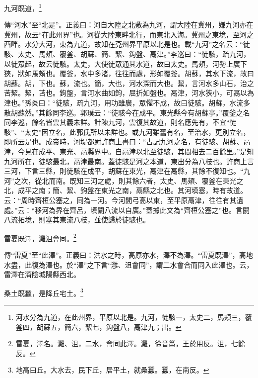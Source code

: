 九河既道，\footnote{河水分為九道，在此州界，平原以北是。九河，徒駭一，太史二，馬頰三，覆釜四，胡蘇五，簡六，絜七，鉤盤八，鬲津九；出。}

{\noindent\zhuan{}\fzbyks 傳“河水”至“北是”。正義曰：河自大陸之北敷為九河，謂大陸在冀州，嫌九河亦在冀州，故云“在此州界”也。河從大陸東畔北行，而東北入海。冀州之東境，至河之西畔。水分大河，東為九道，故知在兗州界平原以北是也。載“九河”之名云：“徒駭、太史、馬頰、覆釜、胡蘇、簡、絜、鉤盤、鬲津。”李巡曰：“徒駭，疏九河，以徒眾起，故云徒駭。太史，大使徒眾通其水道，故曰太史。馬頰，河勢上廣下狹，狀如馬頰也。覆釜，水中多渚，往往而處，形如覆釜。胡蘇，其水下流，故曰胡蘇。胡，下也。蘇，流也。簡，大也，河水深而大也。絜，言河水多山石，治之苦絜。絜，苫也。鉤盤，言河水曲如鉤，屈折如盤也。鬲津，河水狹小，可鬲以為津也。”孫炎曰：“徒駭，疏九河，用功雖廣，眾懼不成，故曰徒駭。胡蘇，水流多散胡蘇然。”其餘同李巡。郭璞云：“徒駭今在成平。東光縣今有胡蘇亭。”覆釜之名同李巡，餘名皆雲其義未詳。計陳九河，雲復其故道，則名應先有，不宜“徒駭”、“太史”因立名，此郭氏所以未詳也。或九河雖舊有名，至治水，更別立名，即所云是也。成帝時，河堤都尉許商上書曰：“古記九河之名，有徒駭、胡蘇、鬲津，今見在成平、東光、鬲縣界中。自鬲津以北至徒駭，其間相去二百餘里。”是知九河所在，徒駭最北，鬲津最南。蓋徒駭是河之本道，東出分為八枝也。許商上言三河，下言三縣，則徒駭在成平，胡蘇在東光，鬲津在鬲縣，其餘不復知也。“九河”之次，從北而南。既知三河之處，則其餘六者，太史、馬頰、覆釜在東光之北，成平之南；簡、絜、鉤盤在東光之南，鬲縣之北也。其河填塞，時有故道。云：“周時齊桓公塞之，同為一河。今河間弓高以東，至平原鬲津，往往有其遺處。”云：“移河為界在齊呂，填閼八流以自廣。”蓋據此文為“齊桓公塞之”也。言閼八流拓境，則塞其東流八枝，並使歸於徒駭也。 \par}

雷夏既澤，灉沮會同。\footnote{雷夏，澤名。灉、沮，二水，會同此澤。灉，徐音邕，王於用反。沮，七餘反。}

{\noindent\zhuan{}\fzbyks 傳“雷夏”至“此澤”。正義曰：洪水之時，高原亦水，澤不為澤。“雷夏既澤”，高地水盡，此復為澤也。於“澤”之下言“灉、沮會同”，謂二水會合而同入此澤也。云，雷澤在濟陰城陽縣西北。 \par}

桑土既蠶，是降丘宅土。\footnote{地高曰丘。大水去，民下丘，居平土，就桑蠶。蠶，在南反。}

